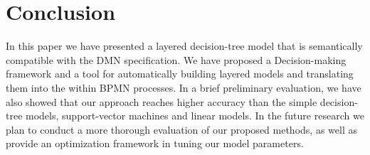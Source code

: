 \documentclass[runningheads]{llncs}
\begin{document}
\section{Conclusion}
\label{sec_conclusion}

In this paper we have presented a layered decision-tree model that is semantically compatible with the DMN specification. We have proposed a Decision-making framework and a tool for automatically building layered models and translating them into the within BPMN processes. In a brief preliminary evaluation, we have also showed that our approach reaches higher accuracy than the simple decision-tree models, support-vector machines and linear models. In the future research we plan to conduct a more thorough evaluation of our proposed methods, as well as provide an optimization framework in tuning our model parameters.




\end{document}
